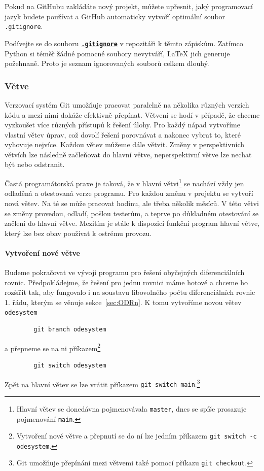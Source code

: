\documentclass[a4paper,11pt,twoside]{article}
\newcommand{\subsubsubsection}[1]{\paragraph{#1}\mbox{}

}
\def\code#1{\textnormal{\texttt{#1}}}
\def\ghfile#1#2{\textnormal{\textbf{\texttt{\href{https://github.com/PavelStransky/PCInPhysics/blob/main/#1#2}{#2}}}}}
\theoremstyle{red}
\theoremstyle{green}
\begin{document}
    Pokud na GitHubu zakládáte nový projekt, můžete upřesnit, jaký programovací jazyk budete používat a GitHub automaticky vytvoří optimální soubor \code{.gitignore}.

    \begin{task}
        Podívejte se do souboru \ghfile{}{.gitignore} v repozitáři k těmto zápiskům.
        Zatímco Python si téměř žádné pomocné soubory nevytváří, {\LaTeX} jich generuje požehnaně.
        Proto je seznam ignorovaných souborů celkem dlouhý. 
    \end{task}

\subsubsection{Větve}
\label{sec:branches}
    Verzovací systém Git umožňuje pracovat paralelně na několika různých verzích kódu a mezi nimi dokáže efektivně přepínat.
    Větvení se hodí v případě, že chceme vyzkoušet více různých přístupů k řešení úlohy.
    Pro každý nápad vytvoříme vlastní větev úprav, což dovolí řešení porovnávat a nakonec vybrat to, které vyhovuje nejvíce.
    Každou větev můžeme dále větvit.
    Změny v perspektivních větvích lze následně začleňovat do hlavní větve, neperspektivní větve lze nechat být nebo odstranit.
    
    Častá programátorská praxe je taková, že v hlavní větvi\footnote{Hlavní větev se donedávna pojmenovávala \code{master}, dnes se spíše prosazuje pojmenování \code{main}.} se nachází vždy jen odladěná a otestovaná verze programu.
    Pro každou změnu v projektu se vytvoří nová větev.
    Na té se může pracovat hodinu, ale třeba několik měsíců.
    V této  větvi se změny provedou, odladí, pošlou testerům, a teprve po důkladném otestování se začlení do hlavní větve.
    Mezitím je stále k dispozici funkční program hlavní větve, který lze bez obav používat k ostrému provozu.

\subsubsubsection{Vytvoření nové větve}
    Budeme pokračovat ve vývoji programu pro řešení obyčejných diferenciálních rovnic.
    Předpokládejme, že řešení pro jednu rovnici máme hotové a chceme ho rozšířit tak, aby fungovalo i na soustavu libovolného počtu diferenciálních rovnic 1. řádu, kterým se věnuje sekce~\ref{sec:ODRn}.
    K tomu vytvoříme novou větev \code{odesystem}
    \begin{lstlisting}
        git branch odesystem\end{lstlisting}
    a přepneme se na ni příkazem\footnote{
        Vytvoření nové větve a přepnutí se do ní lze jedním příkazem \code{git switch -c odesystem}.
    }
    \begin{lstlisting}
        git switch odesystem\end{lstlisting}
        Zpět na hlavní větev se lze vrátit příkazem \code{git switch main}.\footnote{
            Git umožňuje přepínání mezi větvemi také pomocí příkazu \code{git checkout}.
        }
\end{document}
